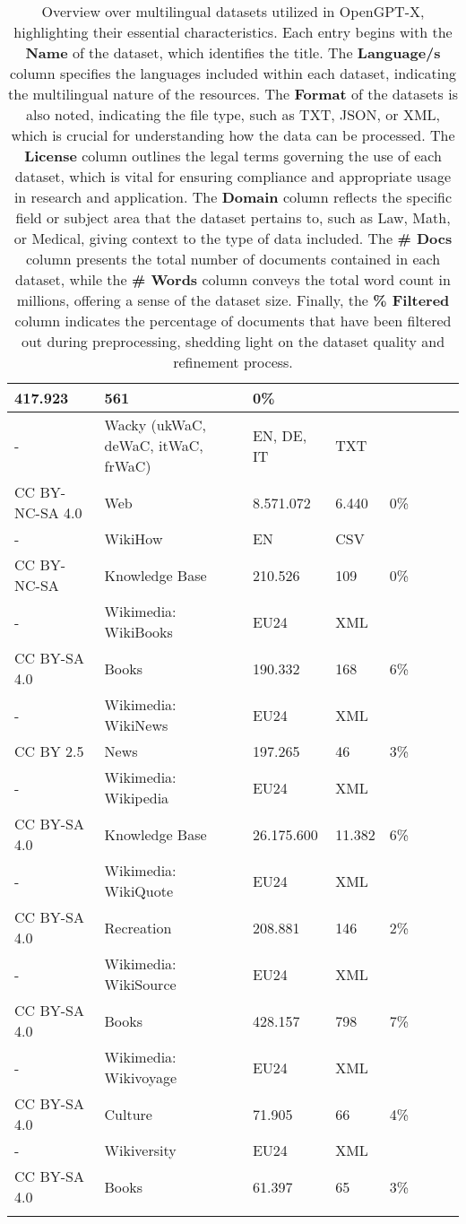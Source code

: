 \begin{longtable}{p{2cm}
p{3cm} p{2.2cm} p{2.7cm} p{2.4cm}>{\raggedleft\arraybackslash}p{1.7cm}>{\raggedleft\arraybackslash}p{1.5cm}>{\centering\arraybackslash}p{1.8cm}}
  417.923 &
  561 &
  0\% \\ \midrule
- & 
Wacky (ukWaC, deWaC, itWaC, frWaC) &
  EN, DE, IT &
  TXT & \\
  CC BY-NC-SA 4.0 &
  Web &
  8.571.072 &
  6.440 &
  0\% \\ \midrule
- & 
WikiHow &
  EN &
  CSV & \\
  CC BY-NC-SA &
  Knowledge Base &
  210.526 &
  109 &
  0\% \\ \midrule
- & 
Wikimedia: WikiBooks &
  EU24 &
  XML & \\
  CC BY-SA 4.0 &
  Books &
  190.332 &
  168 &
  6\% \\ \midrule
- & 
Wikimedia: WikiNews &
  EU24 &
  XML & \\
  CC BY 2.5 &
  News &
  197.265 &
  46 &
  3\% \\ \midrule
- & 
Wikimedia: Wikipedia &
  EU24 &
  XML & \\
  CC BY-SA 4.0 &
  Knowledge Base &
  26.175.600 &
  11.382 &
  6\% \\ \midrule
- & 
Wikimedia: WikiQuote &
  EU24 &
  XML & \\
  CC BY-SA 4.0 &
  Recreation &
  208.881 &
  146 &
  2\% \\ \midrule
- & 
Wikimedia: WikiSource &
  EU24 &
  XML & \\
  CC BY-SA 4.0 &
  Books &
  428.157 &
  798 &
  7\% \\ \midrule
- & 
Wikimedia: Wikivoyage &
  EU24 &
  XML & \\
  CC BY-SA 4.0 &
  Culture &
  71.905 &
  66 &
  4\% \\ \midrule
- & 
Wikiversity &
  EU24 &
  XML & \\
  CC BY-SA 4.0 &
  Books &
  61.397 &
  65 &
  3\% \\ 
  \bottomrule
\caption{\label{tab:curated_data_list}%
Overview over multilingual datasets utilized in OpenGPT-X, highlighting their essential characteristics. Each entry begins with the \textbf{Name} of the dataset, which identifies the title. The \textbf{Language/s} column specifies the languages included within each dataset, indicating the multilingual nature of the resources. The \textbf{Format} of the datasets is also noted, indicating the file type, such as TXT, JSON, or XML, which is crucial for understanding how the data can be processed. The \textbf{License} column outlines the legal terms governing the use of each dataset, which is vital for ensuring compliance and appropriate usage in research and application. The \textbf{Domain} column reflects the specific field or subject area that the dataset pertains to, such as Law, Math, or Medical, giving context to the type of data included. The \textbf{\# Docs} column presents the total number of documents contained in each dataset, while the \textbf{\# Words} column conveys the total word count in millions, offering a sense of the dataset size. Finally, the \textbf{\% Filtered} column indicates the percentage of documents that have been filtered out during preprocessing, shedding light on the dataset quality and refinement process. }
\end{longtable}
